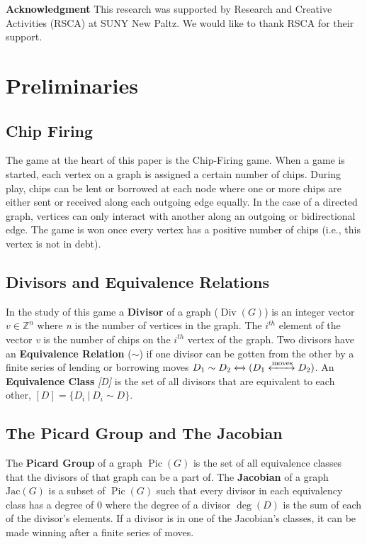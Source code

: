 \documentclass[11pt,reqno]{amsart}
\DeclareMathOperator{\Pic}{Pic}
\DeclareMathOperator{\Div}{Div}
\DeclareMathOperator{\Deg}{deg}
\newcommand{\Jac}{\textrm{Jac}}{}
\theoremstyle{definition}
\theoremstyle{plain}
\begin{document}
\bigskip

\textbf{Acknowledgment}\hspace{0.1cm} This research was supported by Research and Creative Activities (RSCA) at
	SUNY New Paltz. We would like to thank RSCA for their support.

\section{Preliminaries}
	\subsection{Chip Firing}
		The game at the heart of this paper is the Chip-Firing game. When a game is started, each vertex on
		a graph is assigned a certain number of chips.  During play, chips can be lent or borrowed at each
		node where one or more chips are either sent or received along each outgoing edge equally.  In the
		case of a directed graph, vertices can only interact with another along an outgoing or
		bidirectional edge.  The game is won once every vertex has a positive number of chips (i.e., this
		vertex is not in debt).

	\subsection{Divisors and Equivalence Relations}
		In the study of this game a \textbf{Divisor} of a graph ($\Div(G)$) is an integer vector $v\in\mathbb{Z}^n$
		where \textit{n} is the number of vertices in the graph.  The $i^{th}$ element of the vector \textit{v}
		is the number of chips on the $i^{th}$ vertex of the graph.  Two divisors have an \textbf{Equivalence Relation}
		($\sim$) if one divisor can be gotten from the other by a finite series of lending or borrowing moves
		$D_1 \sim D_2 \xleftrightarrow{} (D_1 \xleftrightarrow{\text{moves}} D_2)$.  An \textbf{Equivalence Class} \textit{[D]}
		is the set of all divisors that are equivalent to each other, $[D] = \{D_i~|~D_i \sim D\}$.

	\subsection{The Picard Group and The Jacobian}
		The \textbf{Picard Group} of a graph $\Pic(G)$ is the set of all equivalence classes that the
		divisors of that graph can be a  part of. The \textbf{Jacobian} of a graph  $\Jac(G)$ is a subset
		of $\Pic(G)$ such that every divisor in each equivalency class has a degree of $0$ where the
		degree of a divisor $\Deg(D)$ is the sum of each of the divisor's elements.
		If a divisor is in one of the Jacobian's classes, it can be made winning after a finite series of moves.
\end{document}
